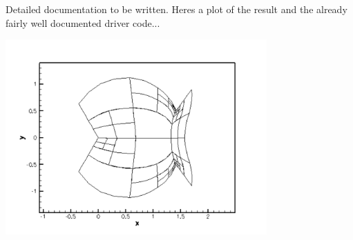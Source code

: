 Detailed documentation to be written. Here\textquotesingle{}s a plot of the result and the already fairly well documented driver code...

 
\begin{DoxyImage}
\includegraphics[width=0.75\textwidth]{static_fish}
\end{DoxyImage}



